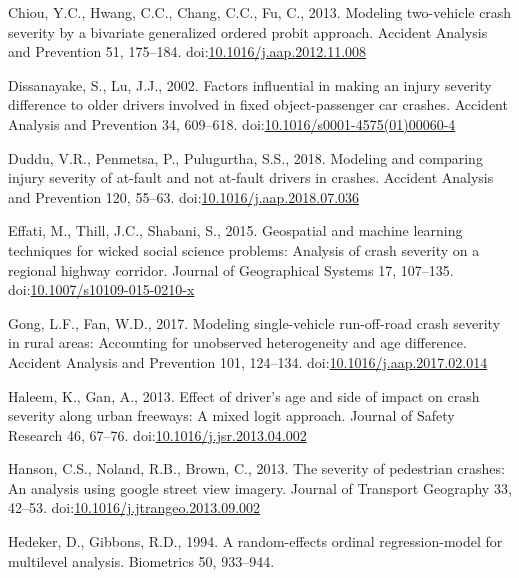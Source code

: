 \documentclass[]{elsarticle} %
\begin{document}
\leavevmode\hypertarget{ref-Chiou2013modeling}{}%
Chiou, Y.C., Hwang, C.C., Chang, C.C., Fu, C., 2013. Modeling
two-vehicle crash severity by a bivariate generalized ordered probit
approach. Accident Analysis and Prevention 51, 175--184.
doi:\href{https://doi.org/10.1016/j.aap.2012.11.008}{10.1016/j.aap.2012.11.008}

\leavevmode\hypertarget{ref-Dissanayake2002factors}{}%
Dissanayake, S., Lu, J.J., 2002. Factors influential in making an injury
severity difference to older drivers involved in fixed object-passenger
car crashes. Accident Analysis and Prevention 34, 609--618.
doi:\href{https://doi.org/10.1016/s0001-4575(01)00060-4}{10.1016/s0001-4575(01)00060-4}

\leavevmode\hypertarget{ref-Duddu2018modeling}{}%
Duddu, V.R., Penmetsa, P., Pulugurtha, S.S., 2018. Modeling and
comparing injury severity of at-fault and not at-fault drivers in
crashes. Accident Analysis and Prevention 120, 55--63.
doi:\href{https://doi.org/10.1016/j.aap.2018.07.036}{10.1016/j.aap.2018.07.036}

\leavevmode\hypertarget{ref-Effati2015geospatial}{}%
Effati, M., Thill, J.C., Shabani, S., 2015. Geospatial and machine
learning techniques for wicked social science problems: Analysis of
crash severity on a regional highway corridor. Journal of Geographical
Systems 17, 107--135.
doi:\href{https://doi.org/10.1007/s10109-015-0210-x}{10.1007/s10109-015-0210-x}

\leavevmode\hypertarget{ref-Gong2017modeling}{}%
Gong, L.F., Fan, W.D., 2017. Modeling single-vehicle run-off-road crash
severity in rural areas: Accounting for unobserved heterogeneity and age
difference. Accident Analysis and Prevention 101, 124--134.
doi:\href{https://doi.org/10.1016/j.aap.2017.02.014}{10.1016/j.aap.2017.02.014}

\leavevmode\hypertarget{ref-Haleem2013effect}{}%
Haleem, K., Gan, A., 2013. Effect of driver's age and side of impact on
crash severity along urban freeways: A mixed logit approach. Journal of
Safety Research 46, 67--76.
doi:\href{https://doi.org/10.1016/j.jsr.2013.04.002}{10.1016/j.jsr.2013.04.002}

\leavevmode\hypertarget{ref-Hanson2013severity}{}%
Hanson, C.S., Noland, R.B., Brown, C., 2013. The severity of pedestrian
crashes: An analysis using google street view imagery. Journal of
Transport Geography 33, 42--53.
doi:\href{https://doi.org/10.1016/j.jtrangeo.2013.09.002}{10.1016/j.jtrangeo.2013.09.002}

\leavevmode\hypertarget{ref-Hedeker1994random}{}%
Hedeker, D., Gibbons, R.D., 1994. A random-effects ordinal
regression-model for multilevel analysis. Biometrics 50, 933--944.
\end{document}

